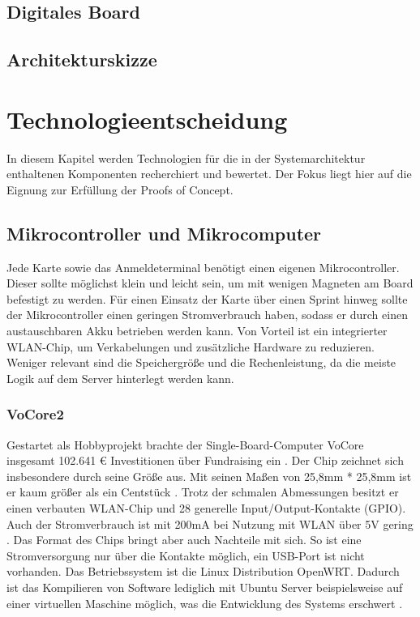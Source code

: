 \documentclass[12pt,titlepage]{scrartcl}
\begin{document}
		\subsection{Digitales Board}
		\subsection{Architekturskizze}
	\newpage	
	\section{Technologieentscheidung}
	In diesem Kapitel werden Technologien für die in der Systemarchitektur enthaltenen Komponenten recherchiert und bewertet. Der Fokus liegt hier auf die Eignung zur Erfüllung der Proofs of Concept.
		\subsection{Mikrocontroller und Mikrocomputer}
		Jede Karte sowie das Anmeldeterminal benötigt einen eigenen Mikrocontroller. Dieser sollte möglichst klein und leicht sein, um mit wenigen Magneten am Board befestigt zu werden. Für einen Einsatz der Karte über einen Sprint hinweg sollte der Mikrocontroller einen geringen Stromverbrauch haben, sodass er durch einen austauschbaren Akku betrieben werden kann. Von Vorteil ist ein integrierter WLAN-Chip, um Verkabelungen und zusätzliche Hardware zu reduzieren. Weniger relevant sind die Speichergröße und die Rechenleistung, da die meiste Logik auf dem Server hinterlegt werden kann. 
			\subsubsection{VoCore2}
			Gestartet als Hobbyprojekt brachte der Single-Board-Computer VoCore insgesamt 102.641 \euro{} Investitionen über Fundraising ein \cite{vocorefundraising}. Der Chip zeichnet sich insbesondere durch seine Größe aus. Mit seinen Maßen von 25,8mm * 25,8mm ist er kaum größer als ein Centstück \cite{vocoregeneral}. Trotz der schmalen Abmessungen besitzt er einen verbauten WLAN-Chip und 28 generelle Input/Output-Kontakte (GPIO). Auch der Stromverbrauch ist mit 200mA bei Nutzung mit WLAN über 5V gering \cite{vocorepower}. Das Format des Chips bringt aber auch Nachteile mit sich. So ist eine Stromversorgung nur über die Kontakte möglich, ein USB-Port ist nicht vorhanden. Das Betriebssystem ist die Linux Distribution OpenWRT. Dadurch ist das Kompilieren von Software lediglich mit Ubuntu Server beispielsweise auf einer virtuellen Maschine möglich, was die Entwicklung des Systems erschwert \cite{vocorecompile}.
\end{document}

